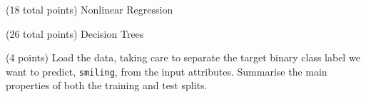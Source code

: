\documentclass[12pt]{article}
\begin{document}
\begin{question}{(18 total points) Nonlinear Regression}
\begin{subquestion}
\end{subquestion}



\end{question}






\clearpage


\begin{question}{(26 total points) Decision Trees}





%
%
\begin{subquestion}{(4 points) Load the data, taking care to separate the target binary class label we want to predict, \texttt{smiling}, from the input attributes. 
Summarise the main properties of both the training and test splits. 
}



\end{subquestion}
\end{question}
\end{document}
